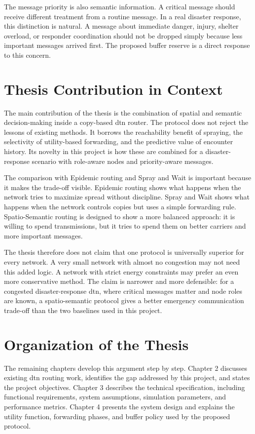 The message priority is also semantic information. A critical message should receive different treatment from a routine message. In a real disaster response, this distinction is natural. A message about immediate danger, injury, shelter overload, or responder coordination should not be dropped simply because less important messages arrived first. The proposed buffer reserve is a direct response to this concern.

\section{Thesis Contribution in Context}
The main contribution of the thesis is the combination of spatial and semantic decision-making inside a copy-based \ac{dtn} router. The protocol does not reject the lessons of existing methods. It borrows the reachability benefit of spraying, the selectivity of utility-based forwarding, and the predictive value of encounter history. Its novelty in this project is how these are combined for a disaster-response scenario with role-aware nodes and priority-aware messages.

The comparison with Epidemic routing and Spray and Wait is important because it makes the trade-off visible. Epidemic routing shows what happens when the network tries to maximize spread without discipline. Spray and Wait shows what happens when the network controls copies but uses a simple forwarding rule. Spatio-Semantic routing is designed to show a more balanced approach: it is willing to spend transmissions, but it tries to spend them on better carriers and more important messages.

The thesis therefore does not claim that one protocol is universally superior for every network. A very small network with almost no congestion may not need this added logic. A network with strict energy constraints may prefer an even more conservative method. The claim is narrower and more defensible: for a congested disaster-response \ac{dtn}, where critical messages matter and node roles are known, a spatio-semantic protocol gives a better emergency communication trade-off than the two baselines used in this project.

\section{Organization of the Thesis}
The remaining chapters develop this argument step by step. Chapter 2 discusses existing \ac{dtn} routing work, identifies the gap addressed by this project, and states the project objectives. Chapter 3 describes the technical specification, including functional requirements, system assumptions, simulation parameters, and performance metrics. Chapter 4 presents the system design and explains the utility function, forwarding phases, and buffer policy used by the proposed protocol.

